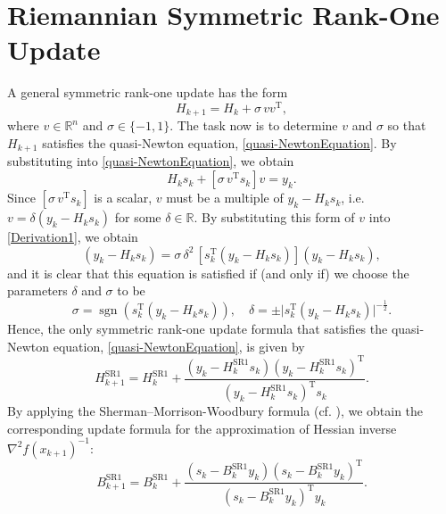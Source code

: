 \section{Riemannian Symmetric Rank-One Update}



A general symmetric rank-one update has the form
\begin{equation*}
    H_{k+1} = H_k + \sigma \, v v^{\mathrm{T}},
\end{equation*}
where $v \in \mathbb{R}^n$ and $\sigma \in \{-1,1\}$. The task now is to determine $v$ and $\sigma$ so that $H_{k+1}$ satisfies the quasi-Newton equation, \cref{quasi-NewtonEquation}. By substituting into \cref{quasi-NewtonEquation}, we obtain
\begin{equation}
    H_k s_k + [\sigma \, v^{\mathrm{T}} s_k] v = y_k.
\end{equation}
Since $[\sigma \, v^{\mathrm{T}} s_k]$ is a scalar, $v$ must be a multiple of $y_k − H_k s_k$, i.e. $v = \delta (y_k − H_k s_k)$ for some $\delta \in \mathbb{R}$. By substituting this form of $v$ into \cref{Derivation1}, we obtain
\begin{equation}
    (y_k − H_k s_k) = \sigma \, \delta^2 \, [s^{\mathrm{T}}_k (y_k − H_k s_k)](y_k − H_k s_k),
\end{equation}
and it is clear that this equation is satisfied if (and only if) we choose the parameters $\delta$ and $\sigma$ to be
\begin{equation*}
    \sigma = \operatorname{sgn} (s^{\mathrm{T}}_k (y_k − H_k s_k)), \quad \delta = \pm \lvert s^{\mathrm{T}}_k (y_k − H_k s_k) \rvert^{-\frac{1}{2}}.
\end{equation*}
Hence, the only symmetric rank-one update formula that satisfies the quasi-Newton equation, \cref{quasi-NewtonEquation}, is given by
\begin{equation}
    H^\mathrm{SR1}_{k+1} = H^\mathrm{SR1}_k + \frac{(y_k - H^\mathrm{SR1}_k s_k) (y_k - H^\mathrm{SR1}_k s_k)^{\mathrm{T}}}{(y_k - H^\mathrm{SR1}_k s_k)^{\mathrm{T}} s_k}.
\end{equation}
By applying the Sherman–Morrison-Woodbury formula (cf. \cite[Theorem~1.2.16]{SunYuan:2006}), we obtain the corresponding update formula for the approximation of Hessian inverse ${\nabla^{2} f(x_{k+1})}^{-1}$:
\begin{equation}
    B^\mathrm{SR1}_{k+1} = B^\mathrm{SR1}_k + \frac{(s_k - B^\mathrm{SR1}_k y_k) (s_k - B^\mathrm{SR1}_k y_k)^{\mathrm{T}}}{(s_k - B^\mathrm{SR1}_k y_k)^{\mathrm{T}} y_k}.
\end{equation}

